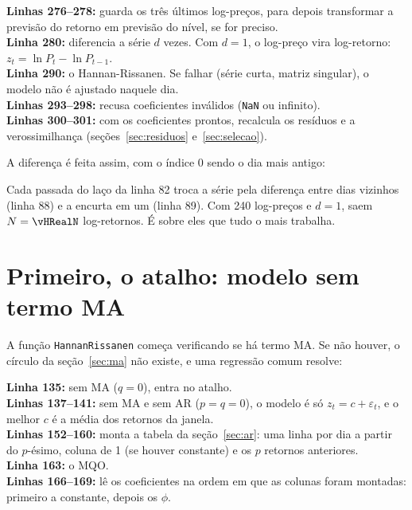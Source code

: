 \documentclass[11pt,a4paper]{article}
\newcommand{\cod}[1]{../../../tg/codigo/#1}
\newcommand{\trecho}[4]{}
\begin{document}
\trecho{\cod{Arima.mqh}}{267}{308}{tg/codigo/Arima.mqh (Apêndice B)}

\begin{leitura}
\textbf{Linhas 276--278:} guarda os três últimos log-preços, para depois transformar a previsão do retorno em
previsão do nível, se for preciso.\\
\textbf{Linha 280:} diferencia a série $d$ vezes. Com $d = 1$, o log-preço vira log-retorno: $z_t = \ln P_t - \ln P_{t-1}$.\\
\textbf{Linha 290:} o Hannan-Rissanen. Se falhar (série curta, matriz singular), o modelo não é ajustado naquele dia.\\
\textbf{Linhas 293--298:} recusa coeficientes inválidos (\texttt{NaN} ou infinito).\\
\textbf{Linhas 300--301:} com os coeficientes prontos, recalcula os resíduos e a verossimilhança (seções~\ref{sec:residuos}
e~\ref{sec:selecao}).
\end{leitura}

A diferença é feita assim, com o índice 0 sendo o dia mais antigo:

\trecho{\cod{Arima.mqh}}{77}{91}{tg/codigo/Arima.mqh}

Cada passada do laço da linha 82 troca a série pela diferença entre dias vizinhos (linha 88) e a encurta em um
(linha 89). Com 240 log-preços e $d = 1$, saem $N = \vHRealN$ log-retornos. É sobre eles que tudo o mais trabalha.

\section{Primeiro, o atalho: modelo sem termo MA}\label{sec:atalho}

A função \texttt{HannanRissanen} começa verificando se há termo MA. Se não houver, o círculo da seção~\ref{sec:ma} não
existe, e uma regressão comum resolve:

\trecho{\cod{Arima.mqh}}{131}{171}{tg/codigo/Arima.mqh}

\begin{leitura}
\textbf{Linha 135:} sem MA ($q = 0$), entra no atalho.\\
\textbf{Linhas 137--141:} sem MA e sem AR ($p = q = 0$), o modelo é só $z_t = c + \varepsilon_t$, e o melhor $c$ é a média
dos retornos da janela.\\
\textbf{Linhas 152--160:} monta a tabela da seção~\ref{sec:ar}: uma linha por dia a partir do $p$-ésimo, coluna de 1
(se houver constante) e os $p$ retornos anteriores.\\
\textbf{Linha 163:} o MQO.\\
\textbf{Linhas 166--169:} lê os coeficientes na ordem em que as colunas foram montadas: primeiro a constante, depois
os $\phi$.
\end{leitura}
\end{document}
